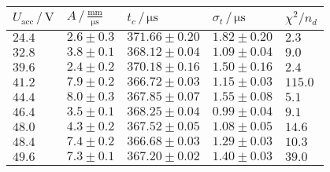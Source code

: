 	\begin{tabular}{|p{2cm}|p{3cm}|p{3cm}|p{3cm}|p{2cm}|}
		\hline
		\rowcolor{tabcolor}
		$U_\mathrm{acc} \, / \, \mathrm{V}$        & $A \, / \, \mathrm{\frac{mm}{\mu s}}$ & 
     			$t_c \, / \, \mathrm{\mu s}$    & $\sigma_t \, / \, \mathrm{\mu s}$ & 
     			$\chi^2 / n_d$ \\ \hline
		$24.4$ & $2.6 \pm 0.3$ & $371.66 \pm 0.20$ & $1.82 \pm 0.20$ & $2.3$\\ 
		$32.8$ & $3.8 \pm 0.1$ & $368.12 \pm 0.04$ & $1.09 \pm 0.04$ & $9.0$\\ 
		$39.6$ & $2.4 \pm 0.2$ & $370.18 \pm 0.16$ & $1.50 \pm 0.16$ & $2.4$\\ 
		$41.2$ & $7.9 \pm 0.2$ & $366.72 \pm 0.03$ & $1.15 \pm 0.03$ & $115.0$\\ 
		$44.4$ & $8.0 \pm 0.3$ & $367.85 \pm 0.07$ & $1.55 \pm 0.08$ & $5.1$\\ 
		$46.4$ & $3.5 \pm 0.1$ & $368.25 \pm 0.04$ & $0.99 \pm 0.04$ & $9.1$\\ 
		$48.0$ & $4.3 \pm 0.2$ & $367.52 \pm 0.05$ & $1.08 \pm 0.05$ & $14.6$\\ 
		$48.4$ & $7.4 \pm 0.2$ & $366.68 \pm 0.03$ & $1.29 \pm 0.03$ & $10.3$\\ 
		$49.6$ & $7.3 \pm 0.1$ & $367.20 \pm 0.02$ & $1.40 \pm 0.03$ & $39.0$\\ 
		\hline
	\end{tabular}
